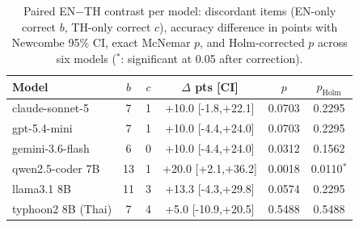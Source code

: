 \begin{table}[t]
\caption{Paired EN$-$TH contrast per model: discordant items (EN-only
correct $b$, TH-only correct $c$), accuracy difference in points with
Newcombe 95\% CI, exact McNemar $p$, and Holm-corrected $p$ across six
models ($^{*}$: significant at 0.05 after correction).}
\label{tab:crosslingual}
\centering\footnotesize\setlength{\tabcolsep}{3.5pt}
\begin{tabular}{lccccc}
\toprule
Model & $b$ & $c$ & $\Delta$ pts [CI] & $p$ & $p_{\text{Holm}}$ \\
\midrule
claude-sonnet-5 & 7 & 1 & +10.0 [-1.8,+22.1] & 0.0703 & 0.2295 \\
gpt-5.4-mini & 7 & 1 & +10.0 [-4.4,+24.0] & 0.0703 & 0.2295 \\
gemini-3.6-flash & 6 & 0 & +10.0 [-4.4,+24.0] & 0.0312 & 0.1562 \\
qwen2.5-coder 7B & 13 & 1 & +20.0 [+2.1,+36.2] & 0.0018 & 0.0110$^{*}$ \\
llama3.1 8B & 11 & 3 & +13.3 [-4.3,+29.8] & 0.0574 & 0.2295 \\
typhoon2 8B (Thai) & 7 & 4 & +5.0 [-10.9,+20.5] & 0.5488 & 0.5488 \\
\bottomrule
\end{tabular}
\end{table}
